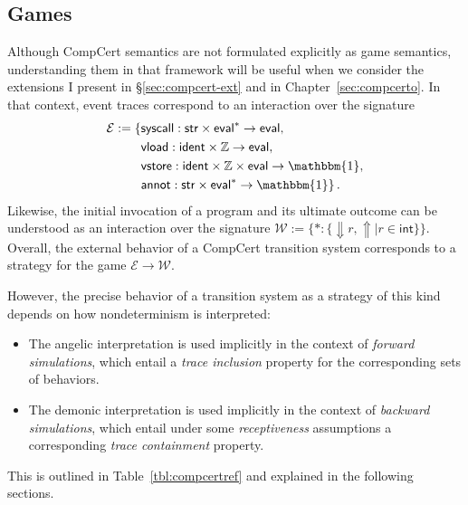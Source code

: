 \documentclass[11pt,oneside]{book}
\theoremstyle{definition}
\newcommand{\kw}[1]{\ensuremath{ \mathsf{#1} }}
\begin{document}

\subsection{Games} \label{sec:sem:games} %

Although CompCert semantics
are not formulated explicitly as game semantics,
understanding them in that framework
will be useful
when we consider the extensions I present in \S\ref{sec:compcert-ext}
and in Chapter~\ref{sec:compcerto}.
In that context,
event traces correspond to an interaction
over the signature
\begin{align*}
  \mathcal{E} := \{ {}
    &\kw{syscall} :
      \kw{str} \times \kw{eval}^* \rightarrow \kw{eval},
      \\
    &\kw{vload} :
      \kw{ident} \times \mathbb{Z} \rightarrow \kw{eval},
      \\
    &\kw{vstore} :
      \kw{ident} \times \mathbb{Z} \times \kw{eval} \rightarrow \mathbbm{1},
      \\
    &\kw{annot} :
      \kw{str} \times \kw{eval}^* \rightarrow \mathbbm{1}
  \}
  \,.
\end{align*}
Likewise,
the initial invocation of a program
and its ultimate outcome can
be understood as an interaction over the signature
$
  \mathcal{W} := \{
    {*} : \{ {\Downarrow} r, {\Uparrow} \mid r \in \kw{int} \}
  \}
$.
Overall,
the external behavior of
a CompCert transition system
corresponds to a strategy
for the game $\mathcal{E} \rightarrow \mathcal{W}$.

However,
the precise behavior of a transition system
as a strategy of this kind
depends on how nondeterminism is interpreted:
\begin{itemize}
  \item
    The angelic interpretation
    is used implicitly in the context of
    \emph{forward simulations},
    which entail a \emph{trace inclusion} property
    for the corresponding sets of behaviors.
  \item
    The demonic interpretation
    is used implicitly in the context of
    \emph{backward simulations},
    which entail
    under some \emph{receptiveness} assumptions
    a corresponding \emph{trace containment} property.
\end{itemize}
This is outlined in Table~\ref{tbl:compcertref}
and explained in the following sections.
\end{document}

